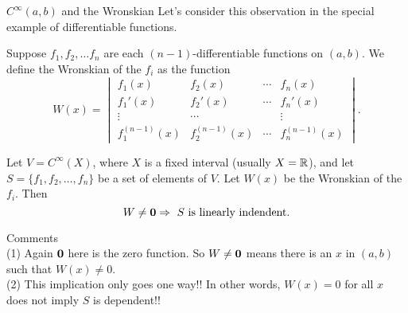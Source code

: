 \begin{frame}{$C^\infty(a,b)$ and the Wronskian}
\footnotesize
Let's consider this observation in the special example of \alert{differentiable} functions. 
\begin{definition}
Suppose $f_1,f_2,\dots f_n$ are each $(n-1)$-differentiable functions on $(a,b)$. We define the Wronskian of the $f_i$ as the function 
\[
W(x)=\begin{vmatrix}f_1(x)&f_2(x)&\cdots &f_n(x)\\
f_1'(x)&f_2'(x)&\cdots &f_n'(x)\\
\vdots&\cdots & &\vdots \\
f_1^{(n-1)}(x)&f_2^{(n-1)}(x)&\cdots &f_n^{(n-1)}(x) 
\end{vmatrix}.
\] 
\end{definition}
\pause 
\begin{theorem}[Wronskian]
Let $V=C^{\infty}(X)$, where $X$ is a fixed interval (usually $X={\mathbb R}$), and let $S=\{f_1,f_2,\dots ,f_n\}$ be a set of elements of $V$. Let $W(x)$ be the Wronskian of the $f_i$. Then 
\[
W\ne{\mathbf 0}\Rightarrow \text{ $S$ is linearly indendent}.
\]
\end{theorem}
\pause 
\alert{Comments}
\\
(1) Again ${\mathbf 0}$ here is the \alert{zero function}. So $W\ne{\mathbf 0}$ means there is an $x$ in $(a,b)$ such that $W(x)\ne 0$. 
\\
(2) This implication only goes one way!! In other words, $W(x)=0$ for all $x$ does not imply $S$ is dependent!! 
\end{frame}